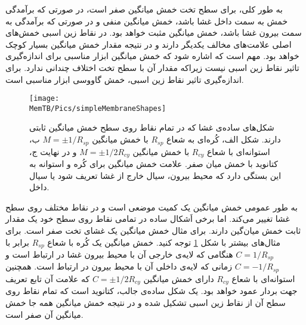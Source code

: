 به طور کلی، برای سطح تخت خمش میانگین صفر است، در صورتی که برآمدگی خمش به سمت داخل غشا باشد، خمش میانگین منفی و در صورتی که برآمدگی به سمت بیرون غشا باشد، خمش میانگین مثبت خواهد بود. در نقاط زین اسبی خمش‌های اصلی علامت‌های مخالف یکدیگر دارند و در نتیجه مقدار خمش میانگین بسیار کوچک خواهد بود. مهم است که اشاره شود که خمش میانگین ابزار مناسبی برای اندازه‌گیری تاثیر نقاط زین اسبی نیست زیراکه مقدار آن با سطح تخت اختلاف چندانی ندارد. برای اندازه‌گیری تاثیر نقاط زین اسبی، خمش گاووسی ابزار مناسبی است.
\begin{figure}[h]
\begin{center}
\texttt{[image: \\MemTB/Pics/simpleMembraneShapes]}
\caption{
شکل‌های ساده‌ی غشا که در تمام نقاط روی سطح خمش میانگین ثابتی دارند. شکل الف، کُره‌ای به شعاع 
$R_{sp}$
با خمش میانگین 
$M=\pm 1/R_{sp}$
ب، استوانه‌ای با شعاع 
$R_{cy}$
با خمش میانگین
$M=\pm 1/2R_{cy}$
و در نهایت ج، کتانوید با خمش میان صفر. علامت خمش میانگین برای کُره و استوانه به این بستگی دارد که محیط بیرون، سیال خارج از غشا تعریف شود یا سیال داخل.
}
\label{fig:simpleMembraneShapes}
\end{center}
\end{figure}
به طور عمومی خمش میانگین یک کمیت موضعی است و در نقاط مختلف روی سطح غشا تغییر می‌کند. اما برخی اَشکال ساده در تمامی نقاط روی سطح خود یک مقدار ثابت خمش میان‌گین دارند. برای مثال خمش میانگین یک غشای تخت صفر است. برای مثال‌های بیشتر با شکل 
\ref{fig:simpleMembraneShapes}
توجه کنید. خمش میانگین یک کُره با شعاع
$R_{sp}$
برابر با 
$C=1/R_{sp}$
هنگامی که لایه‌ی خارجی آن با محیط بیرون غشا در ارتباط است و 
$C=-1/R_{sp}$
زمانی که لایه‌ی داخلی آن با محیط بیرون در ارتباط است. همچنین استوانه‌‌ای با شعاع 
$R_{cy}$
دارای خمش میانگین
$C=\pm1/2R_{cy}$
که علامت آن تابع تعریف جهت بردار عمود خواهد بود. یک شکل ساده‌ی جالب، کتانوید
 است که تمام نقاط روی سطح آن از نقاط زین اسبی تشکیل شده و در نتیجه خمش میانگین همه جا خمش میانگین آن صفر است.





 
 
 
 
 



